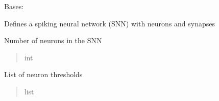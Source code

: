 \documentclass[letterpaper,10pt,english]{sphinxmanual}
\begin{document}
\begin{fulllineitems}
\label{\detokenize{index:superneuromat.SNN}}
\pysigstartsignatures
\pysiglinewithargsret
{}
{\sphinxparamcomma {}}
{}
\pysigstopsignatures
\sphinxAtStartPar
Bases: 

\sphinxAtStartPar
Defines a spiking neural network (SNN) with neurons and synapses

\begin{fulllineitems}
\label{\detokenize{index:superneuromat.SNN.num_neurons}}
\pysigstartsignatures
\pysigline
{}
\pysigstopsignatures
\sphinxAtStartPar
Number of neurons in the SNN
\begin{quote}\begin{description}
\sphinxAtStartPar
int

\end{description}\end{quote}

\end{fulllineitems}


\begin{fulllineitems}
\label{\detokenize{index:superneuromat.SNN.neuron_thresholds}}
\pysigstartsignatures
\pysigline
{}
\pysigstopsignatures
\sphinxAtStartPar
List of neuron thresholds
\begin{quote}\begin{description}
\sphinxAtStartPar
list

\end{description}\end{quote}

\end{fulllineitems}



\end{fulllineitems}
\end{document}
